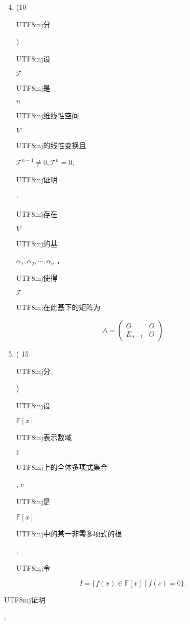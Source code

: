 \documentclass[10pt]{article}
\begin{document}
\begin{enumerate}
  \setcounter{enumi}{3}
  \item (10 \begin{CJK}{UTF8}{mj}分\end{CJK}) \begin{CJK}{UTF8}{mj}设\end{CJK} $\mathscr{T}$ \begin{CJK}{UTF8}{mj}是\end{CJK} $n$ \begin{CJK}{UTF8}{mj}维线性空间\end{CJK} $V$ \begin{CJK}{UTF8}{mj}的线性变换且\end{CJK} $\mathscr{T}^{n-1} \neq 0, \mathscr{T}^{n}=0$, \begin{CJK}{UTF8}{mj}证明\end{CJK}: \begin{CJK}{UTF8}{mj}存在\end{CJK} $V$ \begin{CJK}{UTF8}{mj}的基\end{CJK} $\alpha_{1}, \alpha_{2}, \cdots, \alpha_{n}$ ， \begin{CJK}{UTF8}{mj}使得\end{CJK} $\mathscr{T}$ \begin{CJK}{UTF8}{mj}在此基下的矩阵为\end{CJK}
\end{enumerate}
$$
A=\left(\begin{array}{cc}
O & O \\
E_{n-1} & O
\end{array}\right)
$$

\begin{enumerate}
  \setcounter{enumi}{4}
  \item ( 15 \begin{CJK}{UTF8}{mj}分\end{CJK}) \begin{CJK}{UTF8}{mj}设\end{CJK} $\mathbb{F}[x]$ \begin{CJK}{UTF8}{mj}表示数域\end{CJK} $\mathbb{F}$ \begin{CJK}{UTF8}{mj}上的全体多项式集合\end{CJK}, $c$ \begin{CJK}{UTF8}{mj}是\end{CJK} $\mathbb{F}[x]$ \begin{CJK}{UTF8}{mj}中的某一非零多项式的根\end{CJK}, \begin{CJK}{UTF8}{mj}令\end{CJK}
\end{enumerate}
$$
I=\{f(x) \in \mathbb{F}[x] \mid f(c)=0\} .
$$
\begin{CJK}{UTF8}{mj}证明\end{CJK}:
\end{document}
